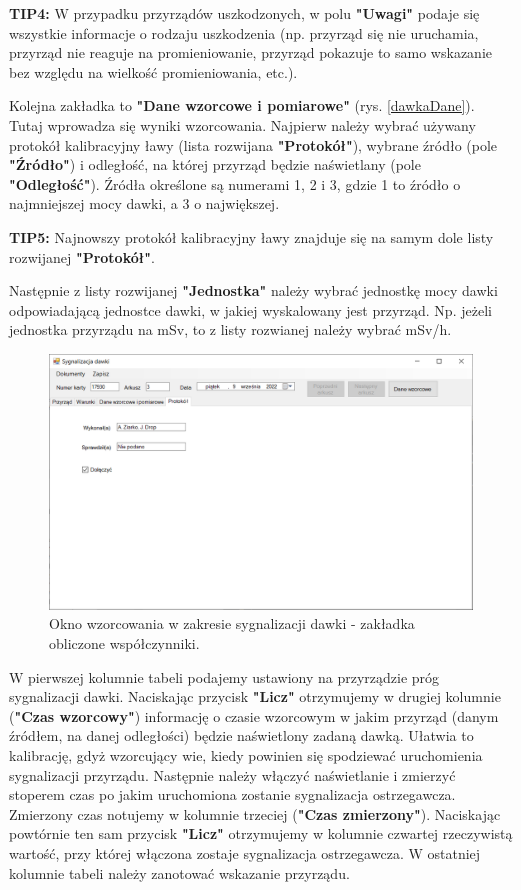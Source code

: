 {{{	\textbf{TIP4:} W przypadku przyrządów uszkodzonych, w polu \textbf{"Uwagi"} podaje się wszystkie informacje o rodzaju uszkodzenia (np. przyrząd się nie uruchamia, przyrząd nie reaguje na promieniowanie, przyrząd pokazuje to samo wskazanie bez względu na wielkość promieniowania, etc.).
	
	Kolejna zakładka to \textbf{"Dane wzorcowe i pomiarowe"} (rys. \ref{dawkaDane}). Tutaj wprowadza się wyniki wzorcowania. Najpierw należy wybrać używany protokół kalibracyjny ławy (lista rozwijana \textbf{"Protokół"}), wybrane źródło (pole \textbf{"Źródło"}) i odległość, na której przyrząd będzie naświetlany (pole \textbf{"Odległość"}). Źródła określone są numerami 1, 2 i 3, gdzie 1 to źródło o najmniejszej mocy dawki, a 3 o największej.
	
	\textbf{TIP5:} Najnowszy protokół kalibracyjny ławy znajduje się na samym dole listy rozwijanej \textbf{"Protokół"}.
	
	Następnie z listy rozwijanej \textbf{"Jednostka"} należy wybrać jednostkę mocy dawki odpowiadającą jednostce dawki, w jakiej wyskalowany jest przyrząd. Np. jeżeli jednostka przyrządu na mSv, to z listy rozwianej należy wybrać mSv/h.
	
	\begin{figure}[htb]
		\centering
		\includegraphics[width=\columnwidth]{obrazki/Wzorcowanie/syg_dawki/wspolczynniki.png}
		\caption{Okno wzorcowania w zakresie sygnalizacji dawki - zakładka obliczone współczynniki.}
		\label{sygDawkiWspolczynniki}
	\end{figure}
	
	W pierwszej kolumnie tabeli podajemy ustawiony na przyrządzie próg sygnalizacji dawki. Naciskając przycisk \textbf{"Licz"} otrzymujemy w drugiej kolumnie (\textbf{"Czas wzorcowy"}) informację o czasie wzorcowym w jakim przyrząd (danym źródłem, na danej odległości) będzie naświetlony zadaną dawką. Ułatwia to kalibrację, gdyż wzorcujący wie, kiedy powinien się spodziewać uruchomienia sygnalizacji przyrządu. Następnie należy włączyć naświetlanie i zmierzyć stoperem czas po jakim uruchomiona zostanie sygnalizacja ostrzegawcza. Zmierzony czas notujemy w kolumnie trzeciej (\textbf{"Czas zmierzony"}). Naciskając powtórnie ten sam przycisk \textbf{"Licz"} otrzymujemy w kolumnie czwartej rzeczywistą wartość, przy której włączona zostaje sygnalizacja ostrzegawcza. W ostatniej kolumnie tabeli należy zanotować wskazanie przyrządu.
	
}}}
